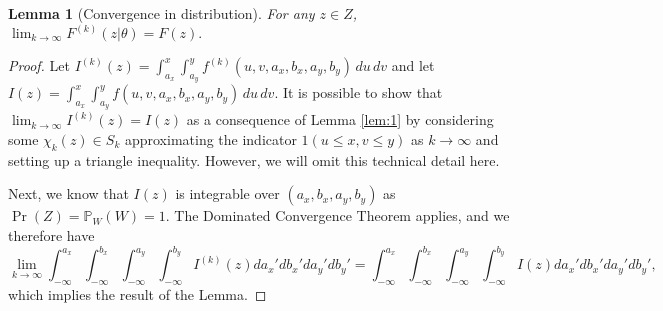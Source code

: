 \documentclass[10pt]{article}
\newtheorem{lemma}{Lemma}
\begin{document}
\begin{lemma}[Convergence in distribution] \label{lem:conv-dist}
  For any $z \in Z$,
  $ \lim_{k \to \infty} F^{(k)}(z | \theta) = F(z).$

\end{lemma}

\begin{proof}
  Let
  $I^{(k)}(z) = \displaystyle \int_{a_x}^{x} \displaystyle
  \int_{a_y}^{y} f^{(k)}(u,v,a_x,b_x,a_y,b_y)\, du\,dv$ and let
  $I(z) = \displaystyle \int_{a_x}^{x} \displaystyle \int_{a_y}^{y}
  f(u,v,a_x,b_x,a_y,b_y)\, du\,dv$. It is possible to show that
  $\lim_{k\to \infty} I^{(k)}(z) = I(z)$ as a consequence of Lemma
  \ref{lem:1} by considering some $\chi_k(z) \in S_k$ approximating
  the indicator $1(u \leq x, v \leq y)$ as $k \to \infty$ and setting up a triangle
  inequality. However, we will omit this technical detail here.

  Next, we know that $I(z)$ is integrable over $(a_x, b_x, a_y, b_y)$
  as $\Pr(Z) = \mathbb{P}_{W}(W) = 1$. The Dominated Convergence
  Theorem applies, and we therefore have
  \[
    \lim_{k \to \infty} \displaystyle \int_{-\infty}^{a_x} \displaystyle \int_{-\infty}^{b_x} \displaystyle \int_{-\infty}^{a_y} \displaystyle \int_{-\infty}^{b_y} I^{(k)}(z) da_x' db_x' da_y' db_y' = \displaystyle \int_{-\infty}^{a_x} \displaystyle \int_{-\infty}^{b_x} \displaystyle \int_{-\infty}^{a_y} \displaystyle \int_{-\infty}^{b_y} I(z) da_x' db_x' da_y' db_y',
  \]
  which implies the result of the Lemma.
\end{proof}
\end{document}
